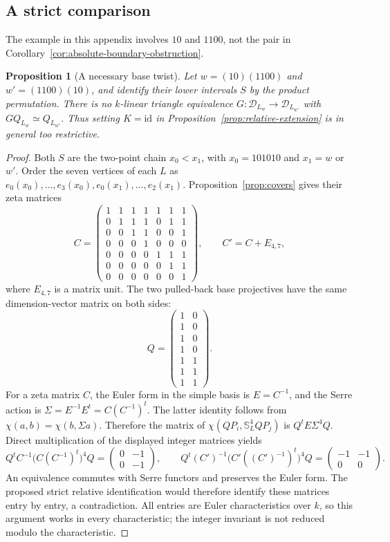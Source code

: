 \documentclass[11pt]{article}
\newtheorem{proposition}[theorem]{Proposition}
\theoremstyle{definition}
\begin{document}
\subsection{A strict comparison}
The example in this appendix involves $10$ and $1100$, not the
pair in Corollary~\ref{cor:absolute-boundary-obstruction}.
\begin{proposition}[A necessary base twist]\label{prop:strict-relative-obstruction}
Let $w=(10)(1100)$ and $w'=(1100)(10)$, and identify their lower
intervals $S$ by the product permutation. There is no $k$-linear
triangle equivalence $G:\mathcal D_{L_w}\to\mathcal D_{L_{w'}}$
with $GQ_{L_w}\simeq Q_{L_{w'}}$. Thus setting
$K=\mathrm{id}$ in Proposition~\ref{prop:relative-extension}
is in general too restrictive.
\end{proposition}
\begin{proof}
Both $S$ are the two-point chain $x_0<x_1$, with $x_0=101010$
and $x_1=w$ or $w'$. Order the seven vertices of each $L$ as
$e_0(x_0),\ldots,e_3(x_0),e_0(x_1),\ldots,e_2(x_1)$.
Proposition~\ref{prop:covers} gives their zeta matrices
\[
 C=\begin{pmatrix}
 1&1&1&1&1&1&1\\
 0&1&1&1&0&1&1\\
 0&0&1&1&0&0&1\\
 0&0&0&1&0&0&0\\
 0&0&0&0&1&1&1\\
 0&0&0&0&0&1&1\\
 0&0&0&0&0&0&1
 \end{pmatrix},\qquad C'=C+E_{4,7},
\]
where $E_{4,7}$ is a matrix unit. The two pulled-back base
projectives have the same dimension-vector matrix on both sides:
\[
 Q=\begin{pmatrix}1&0\\1&0\\1&0\\1&0\\1&1\\1&1\\1&1\end{pmatrix}.
\]
For a zeta matrix $C$, the Euler form in the simple basis is
$E=C^{-1}$, and the Serre action is
$\Sigma=E^{-1}E^t=C(C^{-1})^t$. The latter identity follows from
$\chi(a,b)=\chi(b,\Sigma a)$. Therefore the matrix of
$\chi(QP_i,\mathbb S_L^4 QP_j)$ is $Q^t E\Sigma^4Q$.
Direct multiplication of the displayed integer matrices yields
\[
 Q^t C^{-1}\bigl(C(C^{-1})^t\bigr)^4Q
   =\begin{pmatrix}0&-1\\0&-1\end{pmatrix},\qquad
 Q^t(C')^{-1}\bigl(C'((C')^{-1})^t\bigr)^4Q
   =\begin{pmatrix}-1&-1\\0&0\end{pmatrix}.
\]
An equivalence commutes with Serre functors and preserves the
Euler form. The proposed strict relative identification would
therefore identify these matrices entry by entry, a contradiction.
All entries are Euler characteristics over $k$, so this argument
works in every characteristic; the integer invariant is not
reduced modulo the characteristic.
\end{proof}
\end{document}
